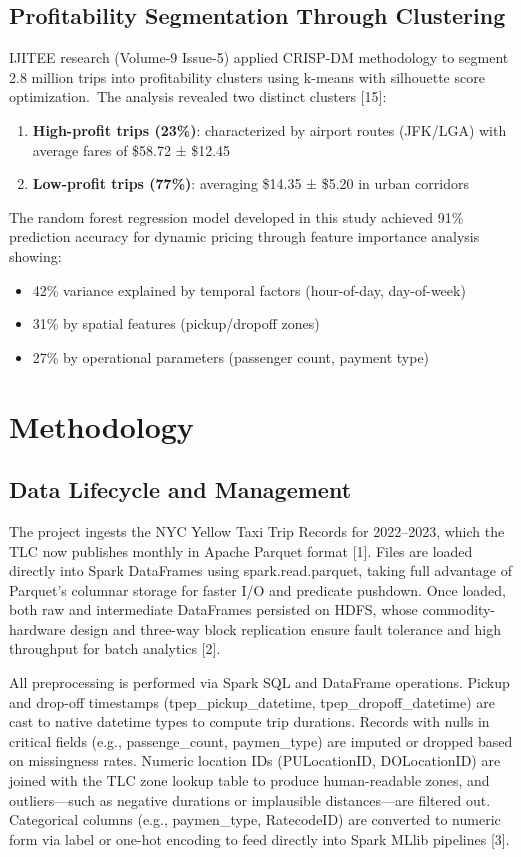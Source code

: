 \documentclass[conference]{IEEEtran}
\begin{document}
\subsection{Profitability Segmentation Through Clustering}
IJITEE research (Volume-9 Issue-5) applied CRISP-DM methodology to segment 2.8 million trips into profitability clusters using k-means with silhouette score optimization. The analysis revealed two distinct clusters [15]:

\begin{enumerate}
  \item \textbf{High-profit trips (23\%)}: characterized by airport routes (JFK/LGA) with average fares of \$58.72 ± \$12.45
  \item \textbf{Low-profit trips (77\%)}: averaging \$14.35 ± \$5.20 in urban corridors
\end{enumerate}

The random forest regression model developed in this study achieved 91\% prediction accuracy for dynamic pricing through feature importance analysis showing:
\begin{itemize}
  \item 42\% variance explained by temporal factors (hour-of-day, day-of-week)
  \item 31\% by spatial features (pickup/dropoff zones)
  \item 27\% by operational parameters (passenger count, payment type) 
\end{itemize}

\section{Methodology}
\subsection{Data Lifecycle and Management}
The project ingests the NYC Yellow Taxi Trip Records for 2022–2023, which the TLC now publishes monthly in Apache Parquet format [1]. Files are loaded directly into Spark DataFrames using spark.read.parquet, taking full advantage of Parquet’s columnar storage for faster I/O and predicate pushdown. Once loaded, both raw and intermediate DataFrames persisted on HDFS, whose commodity-hardware design and three-way block replication ensure fault tolerance and high throughput for batch analytics [2].

All preprocessing is performed via Spark SQL and DataFrame operations. Pickup and drop-off timestamps (tpep\_pickup\_datetime, tpep\_dropoff\_datetime) are cast to native datetime types to compute trip durations. Records with nulls in critical fields (e.g., passenge\_count, paymen\_type) are imputed or dropped based on missingness rates. Numeric location IDs (PULocationID, DOLocationID) are joined with the TLC zone lookup table to produce human-readable zones, and outliers—such as negative durations or implausible distances—are filtered out. Categorical columns (e.g., paymen\_type, RatecodeID) are converted to numeric form via label or one-hot encoding to feed directly into Spark MLlib pipelines [3].
\end{document}
